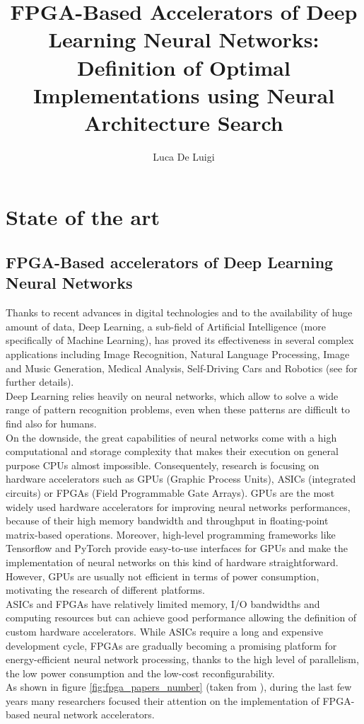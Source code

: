 \documentclass[11pt,a4paper]{article}
\author{Luca De Luigi}
\title{FPGA-Based Accelerators of Deep Learning Neural Networks: Definition of Optimal Implementations using Neural Architecture Search}
\begin{document}
\maketitle

\section{State of the art}
\subsection{FPGA-Based accelerators of Deep Learning Neural Networks}
Thanks to recent advances in digital technologies and to the availability of huge amount of data, Deep Learning, a sub-field of Artificial Intelligence (more specifically of Machine Learning), has proved its effectiveness in several complex applications including Image Recognition, Natural Language Processing, Image and Music Generation, Medical Analysis, Self-Driving Cars and Robotics (see \cite{deep_learning_book} for further details).\\
Deep Learning relies heavily on neural networks, which allow to solve a wide range of pattern recognition problems, even when these patterns are difficult to find also for humans.\\
On the downside, the great capabilities of neural networks come with a high computational and storage complexity that makes their execution on general purpose CPUs almost impossible. Consequentely, research is focusing on hardware accelerators such as GPUs (Graphic Process Units), ASICs (integrated circuits) or FPGAs (Field Programmable Gate Arrays). GPUs are the most widely used hardware accelerators for improving neural networks performances, because of their high memory bandwidth and throughput in floating-point matrix-based operations. Moreover, high-level programming frameworks like Tensorflow and PyTorch provide easy-to-use interfaces for GPUs and make the implementation of neural networks on this kind of hardware straightforward. However, GPUs are usually not efficient in terms of power consumption, motivating the research of different platforms.\\
ASICs and FPGAs have relatively limited memory, I/O bandwidths and computing resources but can achieve good performance allowing the definition of custom hardware accelerators. While ASICs require a long and expensive development cycle, FPGAs are gradually becoming a promising platform for energy-efficient neural network processing, thanks to the high level of parallelism, the low power consumption and the low-cost reconfigurability.\\
As shown in figure \ref{fig:fpga_papers_number} (taken from \cite{wang_survey_2018}), during the last few years many researchers focused their attention on the implementation of FPGA-based neural network accelerators.
\end{document}
